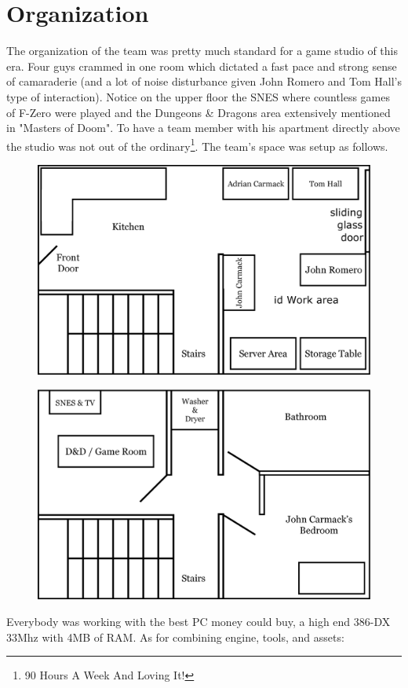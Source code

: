 \documentclass[book.tex]{subfiles}
\begin{document}
\section{Organization}
The organization of the team was pretty much standard for a game studio of this era. Four guys crammed in one room which dictated a fast pace and strong sense of camaraderie (and a lot of noise disturbance given John Romero and Tom Hall's type of interaction). Notice on the upper floor the SNES where countless games of F-Zero were played and the Dungeons \& Dragons area extensively mentioned in "Masters of Doom". To have a team member with his apartment directly above the studio was not out of the ordinary\footnote{90 Hours A Week And Loving It!}. The team's space was setup as follows.
\par
\begin{figure}[H]
  \centering
  \includegraphics[width=\textwidth]{imgs/drawings/map/id-software-office-madison_bottom_floor.eps}
\end{figure}
\par
\begin{figure}[H]
  \centering
  \includegraphics[width=\textwidth]{imgs/drawings/map/id-software-office-madison_top_floor.eps}
\end{figure}
Everybody was working with the best PC money could buy, a high end 386-DX 33Mhz with 4MB of RAM. As for combining engine, tools, and assets:\\
\end{document}

